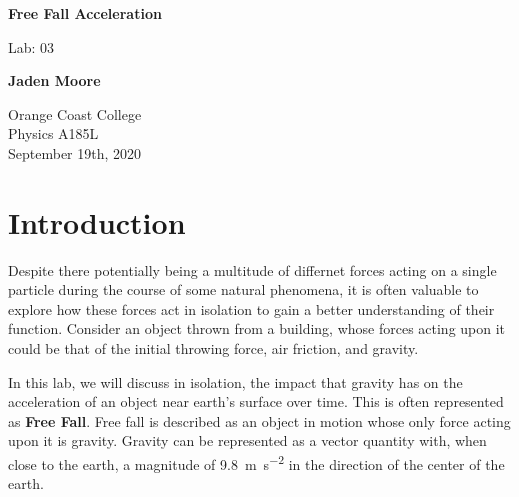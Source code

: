 \documentclass[12pt]{article}
\begin{document}

\begin{titlepage}
    \begin{center}
        \vspace*{1cm}
        \textbf{Free Fall Acceleration}

        \vspace{0.5cm}
        Lab: 03

        \vspace{1cm}

        \textbf{Jaden Moore}

        \vfill

        Orange Coast College\\
        Physics A185L\\
        September 19th, 2020

    \end{center}
\end{titlepage}

\pagestyle{fancy}
\fancyhf{}
\setlength{\headheight}{15pt}
\cfoot{\thepage}

\begin{filecontents}{data1.csv}
    T      Y
    0.00   5.58
    0.10   5.54
    0.20   5.38
    0.30   5.12
    0.40   4.76
    0.50   4.34
    0.60   3.80
    0.70   3.14
    0.80   2.40
    0.90   1.58
    1.00   0.66
    };
\end{filecontents}

\begin{filecontents}{data2.csv}
    T      Y
    0.00   5.58
    0.01   5.54
    0.04   5.38
    0.09   5.12
    0.16   4.76
    0.25   4.34
    0.36   3.80
    0.49   3.14
    0.64   2.40
    0.81   1.58
    1.00   0.66
    };
\end{filecontents}

\section{Introduction}
Despite there potentially being a multitude of differnet forces acting on a single particle during the course of some natural phenomena, it is often valuable to explore how these forces act in isolation to gain a better understanding of their function. Consider an object thrown from a building, whose forces acting upon it could be that of the initial throwing force, air friction, and gravity.

In this lab, we will discuss in isolation, the impact that gravity has on the acceleration of an object near earth's surface over time. This is often represented as \textbf{Free Fall}. Free fall is described as an object in motion whose only force acting upon it is gravity. Gravity can be represented as a vector quantity with, when close to the earth, a magnitude of \SI{9.8}{\metre\per\second\squared} in the direction of the center of the earth.
\end{document}
